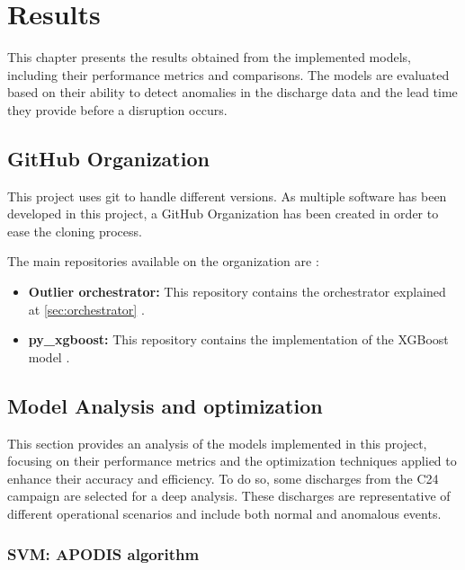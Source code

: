 \chapter{Results}\label{sec:cap4}

This chapter presents the results obtained from the implemented models, including their performance metrics and comparisons. The models are evaluated based on their ability to detect anomalies in the discharge data and the lead time they provide before a disruption occurs.

\section{GitHub Organization}

This project uses git to handle different versions. As multiple software has been developed in this project, a GitHub Organization has been created in order to ease the cloning process.

The main repositories available on the organization are \autocite{OutlierClassifier}:

\begin{itemize}
    \item \textbf{Outlier orchestrator:} This repository contains the orchestrator explained at \autoref{sec:orchestrator} \autocite{OutlierClassifierOutlier_orchestrator2025a}.
    \item \textbf{py\_xgboost:} This repository contains the implementation of the XGBoost model \autocite{OutlierClassifierPy_xgboost2025}.
\end{itemize}

\section{Model Analysis and optimization}

This section provides an analysis of the models implemented in this project, focusing on their performance metrics and the optimization techniques applied to enhance their accuracy and efficiency. To do so, some discharges from the C24 campaign are selected for a deep analysis. These discharges are representative of different operational scenarios and include both normal and anomalous events. 

\subsection{\acs{SVM}: \acs{APODIS} algorithm}

